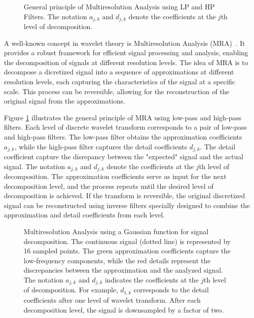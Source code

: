\begin{figure}[htbp]
    \begin{adjustbox}{center}
        
    \end{adjustbox}
    \caption{General principle of Multiresolution Analysis using LP and HP Filters. The notation $a_{j,k}$ and $d_{j,k}$ denote the coefficients at the $j$th level of decomposition.}
    \label{fig:filters_mra}
\end{figure}

A well-known concept in wavelet theory is Multiresolution Analysis (MRA)~\cite{harten1996multiresolution,abgrall1998multiresolution,muller2007fully}. %
It provides a robust framework for efficient signal processing and analysis, enabling the decomposition of signals at different resolution levels.
The idea of MRA is to decompose a dicretized signal into a sequence of approximations at different resolution levels, each capturing the characteristics of the signal at a specific scale.
This process can be reversible, allowing for the reconstruction of the original signal from the approximations.

Figure \ref{fig:filters_mra} illustrates the general principle of MRA using low-pass and high-pass filters.
Each level of discrete wavelet transform corresponds to a pair of low-pass and high-pass filters.
The low-pass filter obtains the approximation coefficients $a_{j,k}$, while the high-pass filter captures the detail coefficients $d_{j,k}$.
The detail coefficient capture the disrepancy between the "expected" signal and the actual signal.
The notation $a_{j,k}$ and $d_{j,k}$ denote the coefficients at the $j$th level of decomposition.
The approximation coefficients serve as input for the next decomposition level, and the process repeats until the desired level of decomposition is achieved.
If the transform is reversible, the original discretized signal can be reconstructed using inverse filters specially designed to combine the approximation and detail coefficients from each level.

\begin{figure}[htbp]
    \begin{adjustbox}{center}
        
    \end{adjustbox}
    \caption{
        Multiresolution Analysis using a Gaussian function for signal decomposition.
        The continuous signal (dotted line) is represented by 16 sampled points.
        The green approximation coefficients capture the low-frequency components, while the red details represent the discrepancies between the approximation and the analyzed signal.
        The notation $a_{j,k}$ and $d_{j,k}$ indicates the coefficients at the $j$th level of decomposition.
        For example, $d_{1,k}$ corresponds to the detail coefficients after one level of wavelet transform.
        After each decomposition level, the signal is downsampled by a factor of two.
        }
    \label{fig:mra_schema}
\end{figure}

